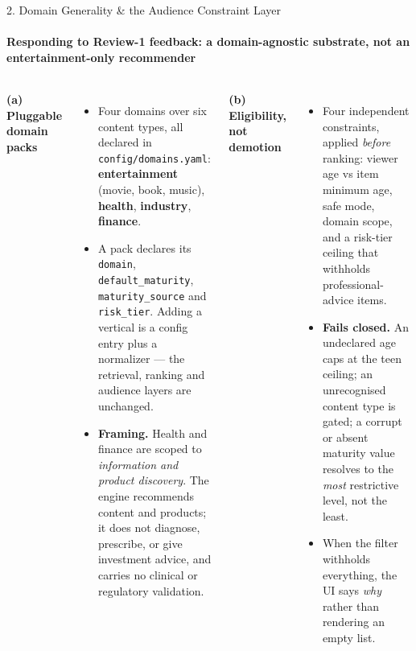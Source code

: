 \documentclass[aspectratio=169, 11pt]{beamer}
\begin{document}
\begin{frame}{2. Domain Generality \& the Audience Constraint Layer}
\framesubtitle{Responding to Review-1 feedback: a domain-agnostic substrate, not an entertainment-only recommender}
\vspace{-1mm}
\begin{columns}[T]
{\scriptsize \textbf{(a) Pluggable domain packs}}
\begin{itemize}\tiny
  \item Four domains over six content types, all declared in \texttt{config/domains.yaml}: \textbf{entertainment} (movie, book, music), \textbf{health}, \textbf{industry}, \textbf{finance}.
  \item A pack declares its \texttt{domain}, \texttt{default\_maturity}, \texttt{maturity\_source} and \texttt{risk\_tier}. Adding a vertical is a config entry plus a normalizer --- the retrieval, ranking and audience layers are unchanged.
  \item \textbf{Framing.} Health and finance are scoped to \emph{information and product discovery}. The engine recommends content and products; it does not diagnose, prescribe, or give investment advice, and carries no clinical or regulatory validation.
\end{itemize}
\vspace{1mm}
{\scriptsize \textbf{(b) Eligibility, not demotion}}
\begin{itemize}\tiny
  \item Four independent constraints, applied \emph{before} ranking: viewer age vs item minimum age, safe mode, domain scope, and a risk-tier ceiling that withholds professional-advice items.
  \item \textbf{Fails closed.} An undeclared age caps at the teen ceiling; an unrecognised content type is gated; a corrupt or absent maturity value resolves to the \emph{most} restrictive level, not the least.
  \item When the filter withholds everything, the UI says \emph{why} rather than rendering an empty list.
\end{itemize}


\end{columns}
\end{frame}
\end{document}
